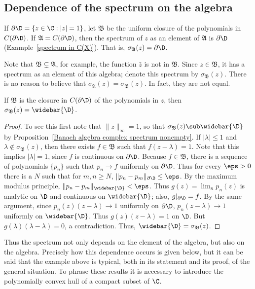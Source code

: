 \subsection{Dependence of the spectrum on the algebra}
If $\partial\D=\{z\in\C:|z|=1\}$, let $\mathfrak{B}$ be the uniform closure of the polynomials in $C(\partial\D)$. If $\mathfrak{A}=C(\partial\D)$, then the spectrum of $z$ as an element of $\mathfrak{A}$ is $\partial\D$ (Example~\ref{spectrum in C(X)}). That is, $\sigma_{\mathfrak{A}}(z)=\partial\D$.\par
Note that $\mathfrak{B}\subsetneq\mathfrak{A}$, for example, the function $\bar{z}$ is not in $\mathfrak{B}$. Since $z\in\mathfrak{B}$, it has a spectrum as an element of this algebra; denote this spectrum by $\sigma_{\mathfrak{B}}(z)$. There is no reason to believe that $\sigma_{\mathfrak{A}}(z)=\sigma_{\mathfrak{B}}(z)$. In fact, they are not equal.
\begin{proposition}\label{spectrum of z in closure of polynomials in z}
If $\mathfrak{B}$ is the closure in $C(\partial\D)$ of the polynomials in $z$, then $\sigma_{\mathfrak{B}}(z)=\widebar{\D}$.
\end{proposition}
\begin{proof}
To see this first note that $\|z\|_\infty=1$, so that $\sigma_{\mathfrak{B}}(z)\sub\widebar{\D}$ by Proposition~\ref{Banach algebra complex spectrum nonempty}. If $|\lambda|\leq 1$ and $\lambda\notin\sigma_{\mathfrak{B}}(z)$, then there exists $f\in\mathfrak{B}$ such that $f(z-\lambda)=1$. Note that this implies $|\lambda|=1$, since $f$ is continuous on $\partial\D$. Because $f\in\mathfrak{B}$, there is a sequence of polynomials $\{p_n\}$ such that $p_n\to f$ uniformly on $\partial\D$. Thus for every $\eps>0$ there is a $N$ such that for $m,n\geq N$, $\|p_n-p_m\|_{\partial\D}\leq\eps$. By the maximum modulus principle, $\|p_n-p_m\|_{\widebar{\D}}<\eps$. Thus $g(z)=\lim_np_n(z)$ is analytic on $\D$ and continuous on $\widebar{\D}$; also, $g|_{\partial\D}=f$. By the same argument, since $p_n(z)(z-\lambda)\to 1$ uniformly on $\partial\D$, $p_n(z-\lambda)\to 1$ uniformly on $\widebar{\D}$. Thus $g(z)(z-\lambda)=1$ on $\D$. But $g(\lambda)(\lambda-\lambda)=0$, a contradiction. Thus, $\widebar{\D}=\sigma_{\mathfrak{B}}(z)$.
\end{proof}
Thus the spectrum not only depends on the element of the algebra, but also on the algebra. Precisely how this dependence occurs is given below, but it can be said that the example above is typical, both in its statement and its proof, of the general situation. To phrase these results it is necessary to introduce the polynomially convex hull of a compact subset of $\C$.
